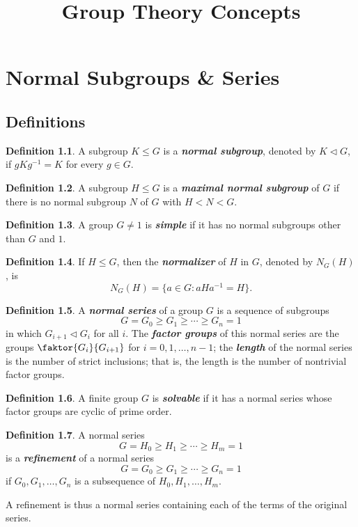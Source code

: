 \documentclass[12pt]{report}
\title{Group Theory Concepts}
\theoremstyle{definition}
\newtheorem*{definition}{Definition}
\newcommand{\term}[1]{\textbf{\textit{#1}}}
\begin{document}
\chapter{Normal Subgroups \& Series}
\section{Definitions}

\begin{definition}
	A subgroup $K\leq G$ is a \term{normal subgroup}, denoted by $K\vartriangleleft G$, if $gKg^{-1}=K$ for every $g\in G$.
\end{definition}

\begin{definition}
	A subgroup $H\leq G$ is a \term{maximal normal subgroup} of $G$ if there is no normal subgroup $N$ of $G$ with $H<N<G$.
\end{definition}

\begin{definition}
	A group $G\neq 1$ is \term{simple} if it has no normal subgroups other than $G$ and $1$.
\end{definition}

\begin{definition}
	If $H\leq G$, then the \term{normalizer} of $H$ in $G$, denoted by $N_G(H)$, is
	\[N_G(H)=\{a\in G:aHa^{-1}=H\}.\]
\end{definition}

\begin{definition}
	A \term{normal series} of a group $G$ is a sequence of subgroups
	\[ G = G_0 \geq G_1 \geq \cdots \geq G_n = 1 \]
	in which $G_{i+1}\vartriangleleft G_i$ for all $i$.
	The \term{factor groups} of this normal series are the groups $\faktor{G_i}{G_{i+1}}$ for $i=0, 1, \ldots, n-1$; the \term{length} of the normal series is the number of strict inclusions; that is, the length is the number of nontrivial factor groups.
\end{definition}

\begin{definition}
	A finite group $G$ is \term{solvable} if it has a normal series whose factor groups are cyclic of prime order.
\end{definition}

\begin{definition}
	A normal series
	\[ G = H_0 \geq H_1 \geq \cdots \geq H_m = 1 \]
	is a \term{refinement} of a normal series
	\[ G = G_0 \geq G_1 \geq \cdots \geq G_n = 1 \]
	if $G_0, G_1, \ldots, G_n$ is a subsequence of $H_0, H_1, \ldots, H_m$.\\
	\par
	A refinement is thus a normal series containing each of the terms of the original series.
\end{definition}
\end{document}
